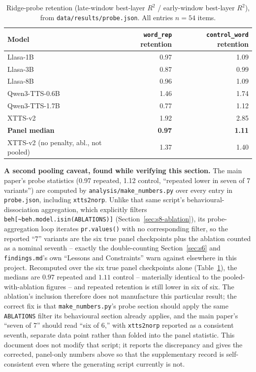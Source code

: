 \documentclass[11pt]{article}
\begin{document}
\begin{table}[h]
\centering
\caption{Ridge-probe retention (late-window best-layer $R^2$ / early-window
best-layer $R^2$), from \texttt{data/results/probe.json}. All entries $n{=}54$
items.}
\label{tab:probe}
\small
\begin{tabular}{@{}lrr@{}}
\toprule
Model & \texttt{word\_rep} retention & \texttt{control\_word} retention \\
\midrule
Llasa-1B & 0.97 & 1.09 \\
Llasa-3B & 0.87 & 0.99 \\
Llasa-8B & 0.96 & 1.09 \\
Qwen3-TTS-0.6B & 1.46 & 1.74 \\
Qwen3-TTS-1.7B & 0.77 & 1.12 \\
XTTS-v2 & 1.92 & 2.85 \\
\midrule
\textbf{Panel median} & \textbf{0.97} & \textbf{1.11} \\
XTTS-v2 (no penalty, abl., not pooled) & 1.37 & 1.40 \\
\bottomrule
\end{tabular}
\end{table}

\textbf{A second pooling caveat, found while verifying this section.} The main
paper's probe statistics (0.97 repeated, 1.12 control,
``repeated lower in seven of 7 variants'') are
computed by \texttt{analysis/make\_numbers.py} over every entry in
\texttt{probe.json}, including \texttt{xtts2norp}. Unlike that same script's
behavioural-dissociation aggregation, which explicitly filters
\texttt{beh[\textasciitilde{}beh.model.isin(ABLATIONS)]}
(Section~\ref{sec:s8-ablation}), its probe-aggregation loop iterates
\texttt{pr.values()} with no corresponding filter, so the reported ``$7$''
variants are the six true panel checkpoints plus the ablation counted as a
nominal seventh -- exactly the double-counting Section~\ref{sec:s6} and
\texttt{findings.md}'s own ``Lessons and Constraints'' warn against elsewhere
in this project. Recomputed over the six true panel checkpoints alone
(Table~\ref{tab:probe}), the medians are $0.97$ repeated and $1.11$ control --
materially identical to the pooled-with-ablation figures -- and repeated
retention is still lower in six of six. The ablation's inclusion therefore
does not manufacture this particular result; the correct fix is that
\texttt{make\_numbers.py}'s probe section should apply the same
\texttt{ABLATIONS} filter its behavioural section already applies, and the
main paper's ``seven of 7'' should read ``six of 6,'' with \texttt{xtts2norp}
reported as a consistent seventh, separate data point rather than folded into
the panel statistic. This document does not modify that script; it reports
the discrepancy and gives the corrected, panel-only numbers above so that the
supplementary record is self-consistent even where the generating script
currently is not.
\end{document}
